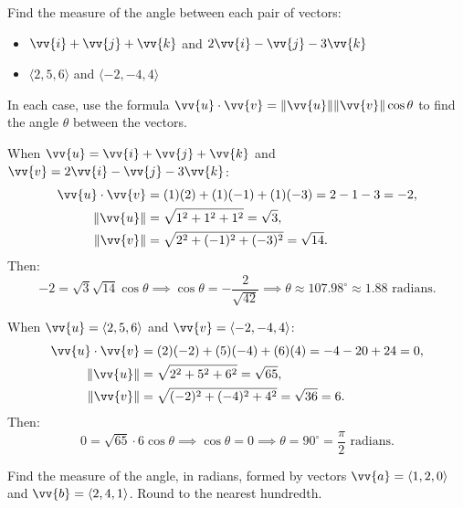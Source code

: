 \documentclass{article}
\begin{document}
\begin{examplebox}
    Find the measure of the angle between each pair of vectors:
    \begin{itemize}
        \item \(\vv{i} + \vv{j} + \vv{k}\) and \(2\vv{i} - \vv{j} - 3\vv{k}\)
        \item \(\langle 2, 5, 6 \rangle\) and \(\langle -2, -4, 4 \rangle\)
    \end{itemize}
    
    \begin{solutionbox}
        \begin{conceptbox}
        In each case, use the formula \(\vv{u} \cdot \vv{v} = \|\vv{u}\| \|\vv{v}\| \cos \theta\) to find the angle \(\theta\) between the vectors.
        \end{conceptbox}

        When \(\vv{u} = \vv{i} + \vv{j} + \vv{k}\) and \(\vv{v} = 2\vv{i} - \vv{j} - 3\vv{k}\):
        \begin{align*}
            \vv{u} \cdot \vv{v} &= (1)(2) + (1)(-1) + (1)(-3) = 2 - 1 - 3 = -2, \\
            \|\vv{u}\| &= \sqrt{1^2 + 1^2 + 1^2} = \sqrt{3}, \\
            \|\vv{v}\| &= \sqrt{2^2 + (-1)^2 + (-3)^2} = \sqrt{14}.
        \end{align*}
        Then:
        \[
        -2 = \sqrt{3} \sqrt{14} \cos \theta \implies \cos \theta = -\frac{2}{\sqrt{42}} \implies \theta \approx 107.98^\circ \approx 1.88 \text{ radians}.
        \]

        When \(\vv{u} = \langle 2, 5, 6 \rangle\) and \(\vv{v} = \langle -2, -4, 4 \rangle\):
        \begin{align*}
            \vv{u} \cdot \vv{v} &= (2)(-2) + (5)(-4) + (6)(4) = -4 - 20 + 24 = 0, \\
            \|\vv{u}\| &= \sqrt{2^2 + 5^2 + 6^2} = \sqrt{65}, \\
            \|\vv{v}\| &= \sqrt{(-2)^2 + (-4)^2 + 4^2} = \sqrt{36} = 6.
        \end{align*}
        Then:
        \[
        0 = \sqrt{65} \cdot 6 \cos \theta \implies \cos \theta = 0 \implies \theta = 90^\circ = \frac{\pi}{2} \text{ radians}.
        \]
    \end{solutionbox}
\end{examplebox}

\begin{exercisebox}
    Find the measure of the angle, in radians, formed by vectors \(\vv{a} = \langle 1, 2, 0 \rangle\) and \(\vv{b} = \langle 2, 4, 1 \rangle\). Round to the nearest hundredth.
\end{exercisebox}
\end{document}

